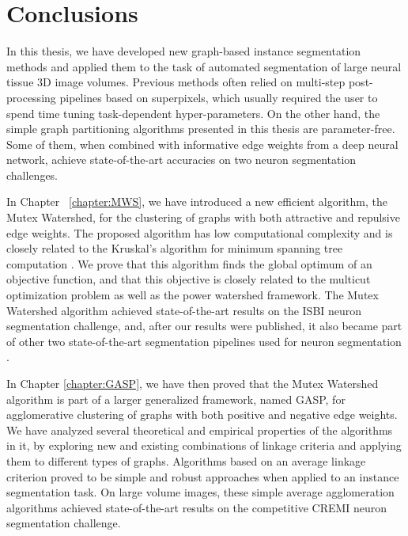 

\chapter*{Conclusions}
In this thesis, we have developed new graph-based instance segmentation methods and applied them to the task of automated segmentation of large neural tissue 3D image volumes. Previous methods often relied on multi-step post-processing pipelines based on superpixels, which usually required the user to spend time tuning task-dependent hyper-parameters. 
On the other hand, the simple graph partitioning algorithms presented in this thesis are parameter-free. Some of them, when combined with informative edge weights from a deep neural network, achieve state-of-the-art accuracies on two neuron segmentation challenges.

In Chapter ~\ref{chapter:MWS}, we have introduced a new efficient algorithm, the Mutex Watershed, for the clustering of graphs with both attractive and repulsive edge weights. The proposed algorithm has low computational complexity and is closely related to the Kruskal's algorithm for minimum spanning tree computation \cite{kruskal1956shortest}.
We prove that this algorithm finds the global optimum of an objective function, and that this objective is closely related to the multicut optimization problem as well as the power watershed framework.
The Mutex Watershed algorithm achieved state-of-the-art results on the ISBI neuron segmentation challenge, and, after our results were published, it also became part of other two state-of-the-art segmentation pipelines used for neuron segmentation \cite{hirsch2020patchperpix,lee2019learning}.

In Chapter \ref{chapter:GASP}, we have then proved that the Mutex Watershed algorithm is part of a larger generalized framework, named GASP, for agglomerative clustering of graphs with both positive and negative edge weights. We have analyzed several theoretical and empirical properties of the algorithms in it, by exploring new and existing combinations of linkage criteria and applying them to different types of graphs. Algorithms based on an average linkage criterion proved to be simple and robust approaches when applied to an instance segmentation task. On large volume images, these simple average agglomeration algorithms achieved state-of-the-art results on the competitive CREMI neuron segmentation challenge. 


